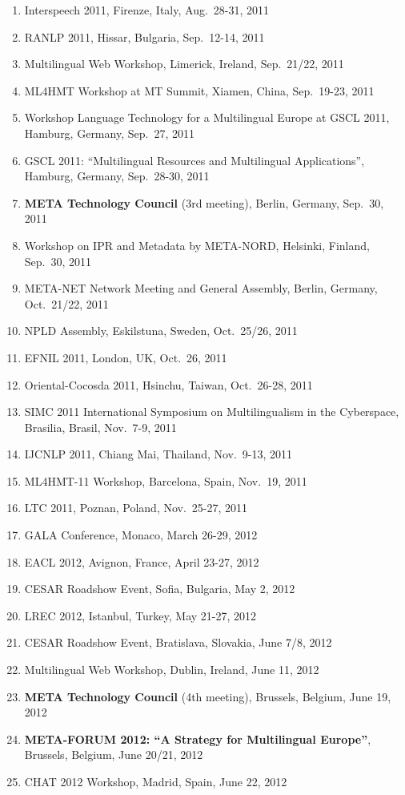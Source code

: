 \documentclass[10pt, plain]{../../metanetpaper}
\begin{document}
\begin{small}
\begin{enumerate}
\item Interspeech 2011, Firenze, Italy, Aug.~28-31, 2011
\item RANLP 2011, Hissar, Bulgaria, Sep.~12-14, 2011
\item Multilingual Web Workshop, Limerick, Ireland, Sep.~21/22, 2011
\item ML4HMT Workshop at MT Summit, Xiamen, China, Sep.~19-23, 2011
\item Workshop Language Technology for a Multilingual Europe at GSCL 2011, Hamburg, Germany, Sep.~27, 2011
\item GSCL 2011: ``Multilingual Resources and Multilingual Applications'', Hamburg, Germany, Sep.~28-30, 2011
\item \textbf{META Technology Council} (3rd meeting), Berlin, Germany, Sep.~30, 2011
\item Workshop on IPR and Metadata by META-NORD, Helsinki, Finland, Sep.~30, 2011
\item META-NET Network Meeting and General Assembly, Berlin, Germany, Oct.~21/22, 2011
\item NPLD Assembly, Eskilstuna, Sweden, Oct.~25/26, 2011
\item EFNIL 2011, London, UK, Oct.~26, 2011
\item Oriental-Cocosda 2011, Hsinchu, Taiwan, Oct.~26-28, 2011
\item SIMC 2011 International Symposium on Multilingualism in the Cyberspace, Brasilia, Brasil, Nov.~7-9, 2011
\item IJCNLP 2011, Chiang Mai, Thailand, Nov.~9-13, 2011
\item ML4HMT-11 Workshop, Barcelona, Spain, Nov.~19, 2011
\item LTC 2011, Poznan, Poland, Nov.~25-27, 2011
\item GALA Conference, Monaco, March 26-29, 2012
\item EACL 2012, Avignon, France, April 23-27, 2012
\item CESAR Roadshow Event, Sofia, Bulgaria, May 2, 2012
\item LREC 2012, Istanbul, Turkey, May 21-27, 2012
\item CESAR Roadshow Event, Bratislava, Slovakia, June 7/8, 2012
\item Multilingual Web Workshop, Dublin, Ireland, June 11, 2012
\item \textbf{META Technology Council} (4th meeting), Brussels, Belgium, June 19, 2012
\item \textbf{META-FORUM 2012: ``A Strategy for Multilingual Europe''}, Brussels, Belgium, June 20/21, 2012
\item CHAT 2012 Workshop, Madrid, Spain, June 22, 2012
\end{enumerate}
\end{small}
\end{document}
